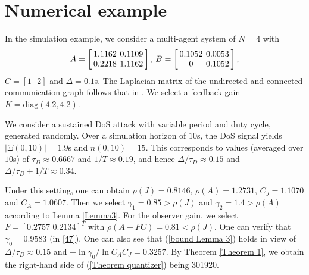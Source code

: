 \documentclass[letterpaper,journal,final,twocolumn]{IEEEtran}
\begin{document}
\section{Numerical example}
In the simulation example, we consider a multi-agent system of $N=4$ with
\begin{align}\setlength{\arraycolsep}{2pt} 
A= 
\left[\begin{array}{cc}
1.1162  &  0.1109 \\
0.2218   & 1.1162
\end{array}
\right],\,
B= 
\left[\begin{array}{cc}
0.1052  &  0.0053 \\
0   & 		0.1052
\end{array}
\right],
\end{align}
$C=[1 \,\,\,\,2]$ and $\Delta=0.1$s. The Laplacian matrix of the undirected and connected communication graph follows that in \cite{feng2020ifac}.
We select a feedback gain $K= \text{diag}(4.2, 4.2)$.

We consider a 
sustained DoS attack with variable period and duty cycle, generated randomly.
Over a simulation horizon of $10$s, the DoS 
signal yields $|\Xi(0,10)|=1.9$s and $n(0,10)=15$. 
This corresponds to values (averaged over $10$s) 
of $\tau_D\approx 0.6667$ and $1/T \approx 0.19$,
and hence $\Delta/\tau_D \approx 0.15$ and
$
\Delta/\tau_D + 1/T \approx 0.34
$.

Under this setting, one can obtain $\rho(J)=0.8146$, $\rho(A)=1.2731$, $C_J=1.1070$ and $C_A=1.0607$. Then we select $\gamma_1=0.85>\rho(J)$ and $\gamma_2=1.4 > \rho(A)$ according to Lemma \ref{Lemma3}. For the observer gain, we select $F=[0.2757\,\,
0.2134]^T$ with $\rho(A-FC)=0.81 < \rho(J)$. One can verify that $\gamma_0=0.9583$ (in \eqref{47}). One can also see that (\ref{bound Lemma 3}) holds in view of $\Delta/\tau_D \approx 0.15$ and $-\ln \gamma_{0} / \ln C_A C_J =0.3257$. By Theorem \ref{Theorem 1}, we obtain the right-hand side of (\ref{Theorem quantizer}) being 301920.
\end{document}
